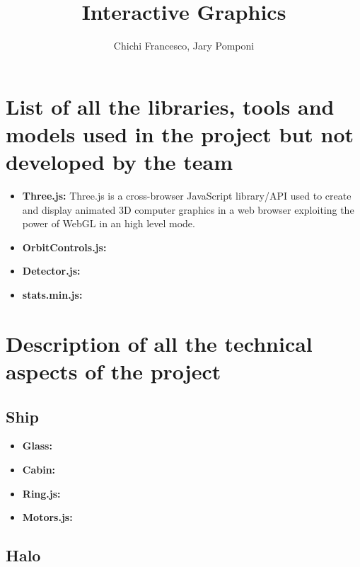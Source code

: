 \documentclass[11pt]{article}
\title{Interactive Graphics}
\author{Chichi Francesco, Jary Pomponi}
\begin{document}
\maketitle
\graphicspath{{img/}}

\section{List of all the libraries, tools and models used in the project but	not developed by the team}
\begin{itemize}
	\item \textbf{Three.js:}
		Three.js is a cross-browser JavaScript library/API used to create and display animated 3D computer graphics in a web browser exploiting the power of WebGL in an high level mode.
	\item \textbf{OrbitControls.js:}
	\item \textbf{Detector.js:}
	\item \textbf{stats.min.js:}
\end{itemize}
\section{Description of all the technical aspects of the project}
\subsection{Ship}
\begin{itemize}
	\item \textbf{Glass:}
	\item \textbf{Cabin:}
	\item \textbf{Ring.js:}
	\item \textbf{Motors.js:}
\end{itemize}
\subsection{Halo}
\end{document}
